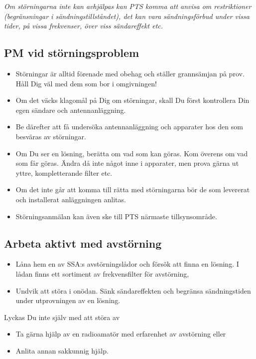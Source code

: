 \emph{Om störningarna inte kan avhjälpas kan PTS komma att anvisa om
  restriktioner (begränsningar i sändningstillståndet), det kan vara
  sändningsförbud under vissa tider, på vissa frekvenser, över viss
  sändareffekt etc.}

\subsection{PM vid störningsproblem}
\begin{itemize}
\item Störningar är alltid förenade med obehag och ställer grannsämjan
  på prov. Håll Dig väl med dem som bor i omgivningen!
\item Om det väcks klagomål på Dig om störningar, skall Du först
  kontrollera Din egen sändare och antennanläggning.
\item Be därefter att få undersöka antennanläggning och apparater hos
  den som besväras av störningar.
\item Om Du ser en lösning, berätta om vad som kan göras. Kom överens
  om vad som får göras. Ändra då inte något inne i apparater, men
  prova gärna ut yttre, kompletterande filter etc.
\item Om det inte går att komma till rätta med störningarna bör de som
  levererat och installerat anläggningen anlitas.
\item Störningsanmälan kan även ske till PTS närmaste tillsynsområde.
\end{itemize}

\subsection{Arbeta aktivt med avstörning}
\begin{itemize}
\item Låna hem en av SSA:s avstörningslådor och försök att finna en
  lösning. I lådan finns ett sortiment av frekvensfilter för
  avstörning,
\item Undvik att störa i onödan. Sänk sändareffekten och begränsa
  sändningstiden under utprovningen av en lösning.
\end{itemize}

Lyckas Du inte själv med att störa av
\begin{itemize}
\item Ta gärna hjälp av en radioamatör med erfarenhet av avstörning
  eller
\item Anlita annan sakkunnig hjälp.
\end{itemize}
